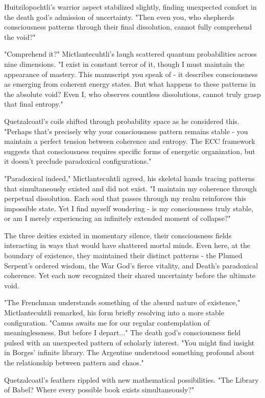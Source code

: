 \begin{refsection}
Huitzilopochtli's warrior aspect stabilized slightly, finding unexpected comfort in the death god's admission of uncertainty. "Then even you, who shepherds consciousness patterns through their final dissolution, cannot fully comprehend the void?"

"Comprehend it?" Mictlantecuhtli's laugh scattered quantum probabilities across nine dimensions. "I exist in constant terror of it, though I must maintain the appearance of mastery. This manuscript you speak of - it describes consciousness as emerging from coherent energy states. But what happens to these patterns in the absolute void? Even I, who observes countless dissolutions, cannot truly grasp that final entropy."

Quetzalcoatl's coils shifted through probability space as he considered this. "Perhaps that's precisely why your consciousness pattern remains stable - you maintain a perfect tension between coherence and entropy. The ECC framework suggests that consciousness requires specific forms of energetic organization, but it doesn't preclude paradoxical configurations."

"Paradoxical indeed," Mictlantecuhtli agreed, his skeletal hands tracing patterns that simultaneously existed and did not exist. "I maintain my coherence through perpetual dissolution. Each soul that passes through my realm reinforces this impossible state. Yet I find myself wondering - is my consciousness truly stable, or am I merely experiencing an infinitely extended moment of collapse?"

The three deities existed in momentary silence, their consciousness fields interacting in ways that would have shattered mortal minds. Even here, at the boundary of existence, they maintained their distinct patterns - the Plumed Serpent's ordered wisdom, the War God's fierce vitality, and Death's paradoxical coherence. Yet each now recognized their shared uncertainty before the ultimate void.

"The Frenchman understands something of the absurd nature of existence," Mictlantecuhtli remarked, his form briefly resolving into a more stable configuration. "Camus awaits me for our regular contemplation of meaninglessness. But before I depart..." The death god's consciousness field pulsed with an unexpected pattern of scholarly interest. "You might find insight in Borges' infinite library. The Argentine understood something profound about the relationship between pattern and chaos."

Quetzalcoatl's feathers rippled with new mathematical possibilities. "The Library of Babel? Where every possible book exists simultaneously?"


\end{refsection}
